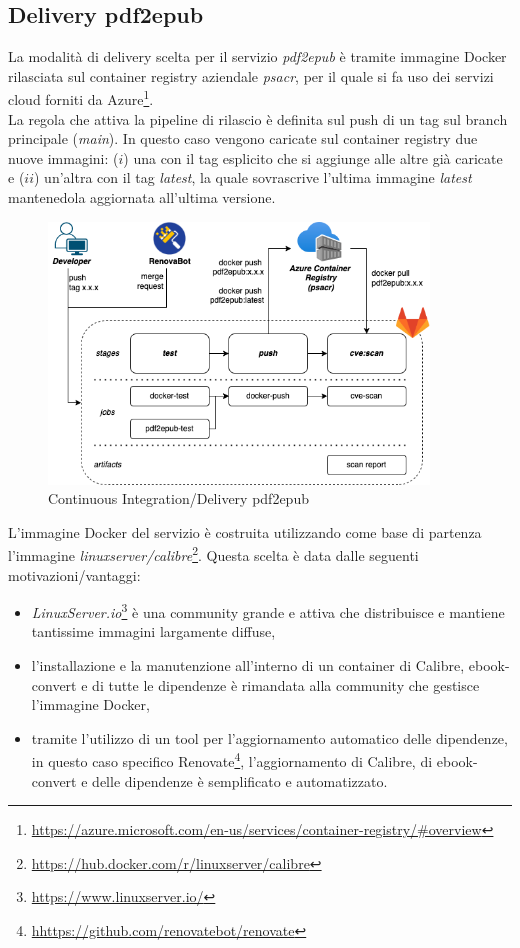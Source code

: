\subsection{Delivery pdf2epub}
La modalità di delivery scelta per il servizio \textit{pdf2epub} è tramite immagine Docker rilasciata sul container registry aziendale \textit{psacr}, per il quale si fa uso dei servizi cloud forniti da Azure\footnote{\url{https://azure.microsoft.com/en-us/services/container-registry/\#overview}}.\\
La regola che attiva la pipeline di rilascio è definita sul push di un tag sul branch principale (\textit{main}). In questo caso vengono caricate sul container registry due nuove immagini: ($i$) una con il tag esplicito che si aggiunge alle altre già caricate e ($ii$) un'altra con il tag \textit{latest}, la quale sovrascrive l'ultima immagine \textit{latest} mantenedola aggiornata all'ultima versione.
\begin{figure}[H]
\centering
\includegraphics[width=0.9\textwidth]{img/tesi-6-pdf2epub.drawio.png}
\caption{Continuous Integration/Delivery pdf2epub}
\end{figure}
L'immagine Docker del servizio è costruita utilizzando come base di partenza l'immagine \textit{linuxserver/calibre}\footnote{\url{https://hub.docker.com/r/linuxserver/calibre}}. Questa scelta è data dalle seguenti motivazioni/vantaggi:
\begin{itemize}
    \item \textit{LinuxServer.io}\footnote{\url{https://www.linuxserver.io/}} è una community grande e attiva che distribuisce e mantiene tantissime immagini largamente diffuse,
    \item l'installazione e la manutenzione all'interno di un container di Calibre, ebook-convert e di tutte le dipendenze è rimandata alla community che gestisce l'immagine Docker,
    \item tramite l'utilizzo di un tool per l'aggiornamento automatico delle dipendenze, in questo caso specifico Renovate\footnote{\url{hhttps://github.com/renovatebot/renovate}}, l'aggiornamento di Calibre, di ebook-convert e delle dipendenze è semplificato e automatizzato.
\end{itemize}
